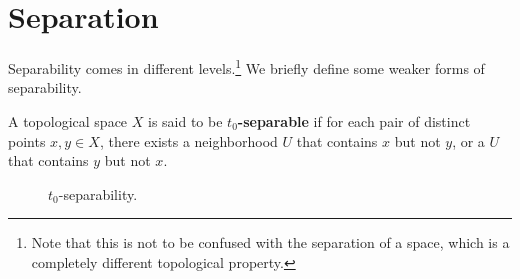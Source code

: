 \section{Separation}

  Separability comes in different levels.\footnote{Note that this is not to be confused with the separation of a space, which is a completely different topological property.} We briefly define some weaker forms of separability. 
  
  \begin{definition}[$t_0$-Separability]
    A topological space $X$ is said to be \textbf{$t_0$-separable} if for each pair of distinct points $x, y \in X$, there exists a neighborhood $U$ that contains $x$ but not $y$, or a $U$ that contains $y$ but not $x$. 

    \begin{figure}[H]
      \centering 
      \caption{$t_0$-separability. } 
      \label{fig:t0_separability}
    \end{figure}
  \end{definition}


